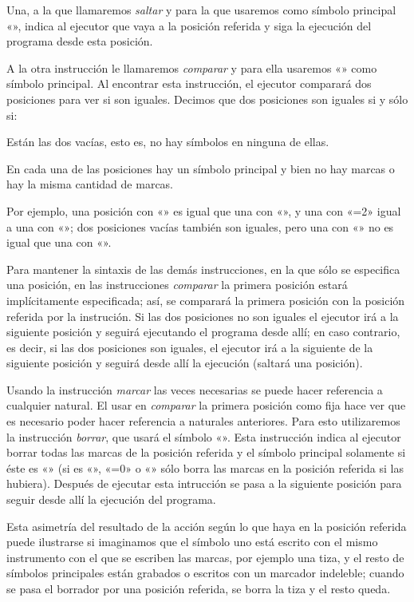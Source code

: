 Una, a la que llamaremos {\it saltar} y para la que usaremos como símbolo principal «\estrella»,
indica al ejecutor que vaya a la posición referida y siga la ejecución del programa desde esta
posición.

A la otra instrucción le llamaremos {\it comparar} y para ella usaremos «» como símbolo
principal. Al encontrar esta instrucción, el ejecutor comparará dos posiciones para ver si son
iguales. Decimos que dos posiciones son iguales si y sólo si:

\listanormal
Están las dos vacías, esto es, no hay símbolos en ninguna de ellas.

En cada una de las posiciones hay un símbolo principal y bien no hay marcas o hay la misma cantidad
de marcas.
\finlista

Por ejemplo, una posición con «» es igual que una con «\inst{}», y una con
«\inst={2}» igual a una con «\inst{}»; dos posiciones vacías también son iguales, pero una
con «» no es igual que una con «».

Para mantener la sintaxis de las demás instrucciones, en la que sólo se especifica una posición,
en las instrucciones {\it comparar} la primera posición estará implícitamente especificada; así, se
comparará la primera posición con la posición referida por la instrución. Si las dos posiciones no
son iguales el ejecutor irá a la siguiente posición y seguirá ejecutando el programa desde allí; en
caso contrario, es decir, si las dos posiciones son iguales, el ejecutor irá a la siguiente de la
siguiente posición y seguirá desde allí la ejecución (saltará una posición).

Usando la instrucción {\it marcar} las veces necesarias se puede hacer referencia a cualquier
natural. El usar en {\it comparar} la primera posición como fija hace ver que es necesario poder
hacer referencia a naturales anteriores. Para esto utilizaremos la instrucción {\it borrar}, que
usará el símbolo «». Esta instrucción indica al ejecutor borrar todas las marcas de la
posición referida y el símbolo principal solamente si éste es «» (si es
«\inst{}», «\inst={0}» o «» sólo borra las marcas en la posición referida si las
hubiera).  Después de ejecutar esta intrucción se pasa a la siguiente posición para seguir desde
allí la ejecución del programa.

Esta asimetría del
resultado de la acción según lo que haya en la posición referida puede ilustrarse si imaginamos que
el símbolo uno está escrito con el mismo instrumento con el que se escriben las marcas, por ejemplo
una tiza, y el resto de símbolos principales están grabados o escritos con un marcador indeleble;
cuando se pasa el borrador por una posición referida, se borra la tiza y el resto queda.

